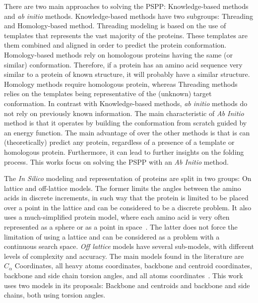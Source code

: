 There are two main approaches to solving the \ac{PSPP}: Knowledge-based methods and
\textit{ab initio} methods. Knowledge-based methods have two subgroups:
Threading and Homology-based method. Threading modeling is based on the use of
templates that represents the vast majority of the proteins. These templates
are them combined and aligned in order to predict the protein conformation.
Homology-based methods rely on homologous proteins having the same (or similar)
conformation. Therefore, if a protein has an amino acid sequence very similar
to a protein of known structure, it will probably have a similar structure.
Homology methods require homologous protein, whereas Threading methods relies
on the templates being representative of the (unknown) target conformation. In
contrast with Knowledge-based methods, \textit{ab initio} methods do not rely
on previously known information. The main characteristic of \textit{Ab Initio}
method is that it operates by building the conformation from scratch guided by
an energy function. The main advantage of  over the other methods
is that is can (theoretically) predict any protein, regardless of a presence
of a template or homologous protein. Furthermore, it can lead to further insights
on the folding process. This works focus on solving the \ac{PSPP} with an \textit{Ab
Initio} method.

The \textit{In Silico} modeling and representation of proteins are split in two
groups: On lattice and off-lattice models. The former limits the angles between
the amino acids in discrete increments, in such way that the protein is limited
to be placed over a point in the lattice and can be considered to be a discrete
problem. It also uses a much-simplified protein model, where each amino acid is
very often represented as a sphere or as a point in space~\cite{berger1998protein}.
The latter does not force the limitation of using a
lattice and can be considered as a problem with
a continuous search space. \textit{Off lattice} models have several
sub-models, with different levels of complexity and accuracy. The main models
found in the literature are $C_\alpha$ Coordinates, all heavy atoms
coordinates, backbone and centroid coordinates, backbone and side chain torsion
angles, and all atoms coordinates~\cite{dorn2014three,rohl2004protein}.
This work uses two models in its proposals: Backbone and centroids and backbone
and side chains, both using torsion angles.

